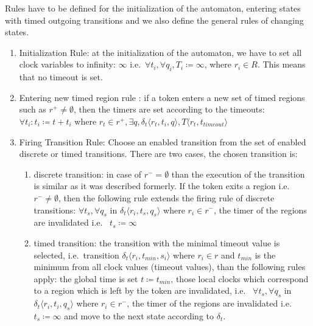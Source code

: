 			Rules have to be defined for the initialization of the automaton, entering states with timed outgoing transitions and we also define the general rules of changing states. 
			
			\begin{enumerate}
				\item Initialization Rule: at the initialization  of the automaton, we have to set all clock variables to infinity: $\infty$ 
				i.e.~$\forall t_i, \forall q_i, T_i \coloneqq \infty $, where $r_i \in R$. This means that no timeout is set.
				
				\item Entering new timed region rule :
				if a token enters a new set of timed regions such as $r^+ \neq \emptyset$, then the timers are set according to the timeouts: $\forall t_i: t_i \coloneqq t + t_i $ where $ r_t \in r^+, \exists q ,\delta_t\langle  r_t,t_i,q \rangle, T \langle r_t, t_{\textit{timeout}} \rangle$
				
				\item Firing Transition Rule: Choose an enabled transition from the set of enabled discrete or timed transitions. 
				There are two cases, the chosen transition is:
				\begin{enumerate}
					\item discrete transition: in case of $r^- = \emptyset$ than the execution of the transition is similar as it was described formerly. 
					If the token exits a region i.e.~$r^- \neq \emptyset$, 
					then the following rule extends the firing rule of discrete transitions:
					$\forall t_s, \forall q_s$ in $ \delta_t \langle r_i, t_s, q_s \rangle$ where $r_i \in r^-$, the timer of the regions are invalidated i.e.~	$t_s \coloneqq \infty$
					\item timed transition: the transition with the minimal timeout value is selected, 
					i.e.~transition $\delta_t \langle r_i, t_{\mathit{min}}, s_i \rangle$ where $ r_i \in r$ and $t_{\mathit{min}}$ is the minimum from all clock values (timeout values),
					than the following rules apply:
					the global time is set $t \coloneqq t_{\textit{min}}$, 
					those local clocks which correspond to a region which is left by the token are invalidated, i.e.~
					$\forall t_s, \forall q_s$ in $ \delta_t \langle r_i, t_i, q_s \rangle$ where $r_i \in r^-$, the timer of the regions are invalidated i.e.~$t_s \coloneqq \infty$ 
					and move to the next state according to $\delta_t$.
				\end{enumerate}			
			\end{enumerate}
			
